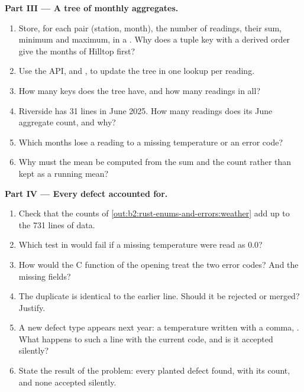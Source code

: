 \begin{problem}
\medskip\noindent\textbf{Part III --- A tree of monthly aggregates.}\par\nopagebreak
\begin{enumerate}[resume, beginpenalty=10000]
\item Store, for each pair (station, month), the number of readings, their sum, minimum and maximum, in a
. Why does a tuple key with a derived order give the months of Hilltop first?
\item Use the  API,  and , to update the tree in one lookup per reading.
\item How many keys does the tree have, and how many readings in all?
\item Riverside has 31 lines in June 2025. How many readings does its June aggregate count, and why?
\item Which months lose a reading to a missing temperature or an error code?
\item Why must the mean be computed from the sum and the count rather than kept as a running mean?
\end{enumerate}

\medskip\noindent\textbf{Part IV --- Every defect accounted for.}\par\nopagebreak
\begin{enumerate}[resume, beginpenalty=10000]
\item Check that the counts of \cref{out:b2:rust-enums-and-errors:weather} add up to the 731 lines of data.
\item Which test in  would fail if a missing temperature were read as 0.0?
\item How would the C function of the opening treat the two error codes? And the missing fields?
\item The duplicate is identical to the earlier line. Should it be rejected or merged? Justify.
\item A new defect type appears next year: a temperature written with a comma, . What happens to such a
line with the current code, and is it accepted silently?
\item State the result of the problem: every planted defect found, with its count, and none accepted silently.
\end{enumerate}
\end{problem}
